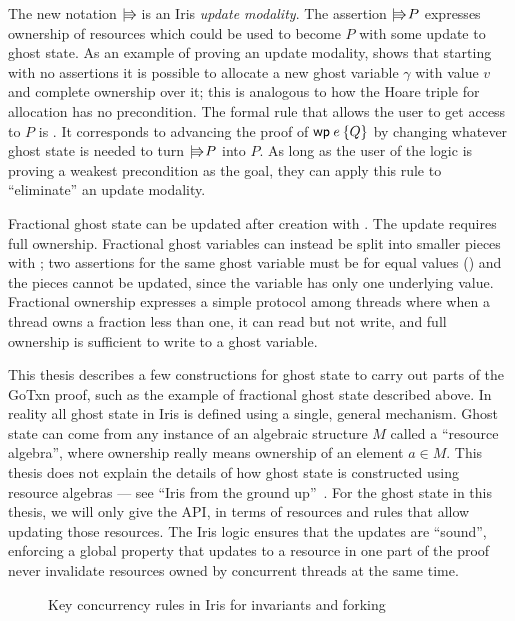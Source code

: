 The new notation $\mathop{\mid\kern-0.4ex\Rrightarrow\kern-0.25ex}$ is an Iris \emph{update modality}. The assertion
$\mathop{\mid\kern-0.4ex\Rrightarrow\kern-0.25ex} P$ expresses ownership of resources which could be used to become $P$ with
some update to ghost state. As an example of proving an update modality,
 shows that starting with no assertions it is possible to
allocate a new ghost variable $\gamma$ with value $v$ and complete ownership
over it; this is analogous to how the Hoare triple for allocation has no
precondition. The formal rule that allows the user to get access to $P$ is
. It corresponds to advancing the proof of $\wpre{e}{Q}$ by
changing whatever ghost state is needed to turn $\mathop{\mid\kern-0.4ex\Rrightarrow\kern-0.25ex} P$ into $P$. As long as
the user of the logic is proving a weakest precondition as the goal, they can
apply this rule to ``eliminate'' an update modality.

Fractional ghost state can be updated after creation with .
The update requires full ownership. Fractional ghost variables can instead be
split into smaller pieces with ; two assertions for the same
ghost variable must be for equal values () and the
pieces cannot be updated, since the variable has only one underlying value.
Fractional ownership expresses a simple protocol among threads where when a
thread owns a fraction less than one, it can read but not write, and full
ownership is sufficient to write to a ghost variable.

This thesis describes a few constructions for ghost state to carry out parts of
the GoTxn proof, such as the example of fractional ghost state described above. In reality all
ghost state in Iris is defined using a single, general mechanism. Ghost state
can come from any instance of an algebraic structure $M$ called
a ``resource algebra'', where ownership really means
ownership of an element $a \in M$. This thesis does not explain the details of
how ghost state is constructed using resource algebras --- see
``Iris from the ground up''~\cite{jung:iris-jfp}. For the ghost
state in this thesis, we will only give the API, in terms of resources and
rules that allow updating those resources. The Iris logic ensures that the
updates are ``sound'', enforcing a global property that updates to a resource in
one part of the proof never invalidate resources owned by concurrent threads at
the same time.

\begin{figure}[ht]
  \caption{Key concurrency rules in Iris for invariants and forking}
  \label{fig:invariants}
\end{figure}

